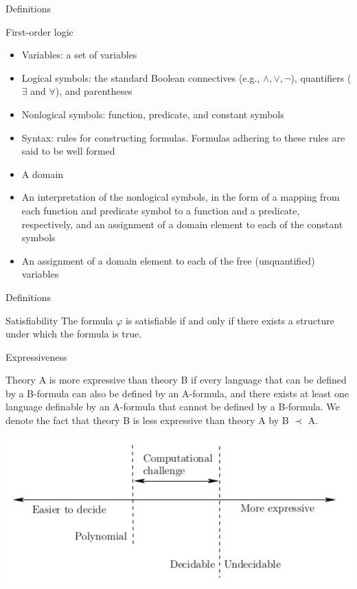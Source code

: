 \documentclass[mathserif]{beamer}
\begin{document}
\begin{frame}{Definitions}
\begin{block}{First-order logic}
\begin{itemize}
\item Variables: a set of variables
\item Logical symbols: the standard Boolean connectives (e.g., $\wedge, \vee, \lnot$), quantifiers ($\exists$ and $\forall$), and parentheses
\item Nonlogical symbols: function, predicate, and constant symbols
\item Syntax: rules for constructing formulas. Formulas adhering to these rules are said to be well formed
\end{itemize}
\end{block}
\begin{block}{}
\begin{itemize}
\item A domain
\item An interpretation of the nonlogical symbols, in the form of a mapping from each function and predicate symbol to a function and a predicate, respectively, and an assignment of a domain element to each of the constant symbols
\item An assignment of a domain element to each of the free (unquantified) variables
\end{itemize}
\end{block}
\end{frame}

\begin{frame}{Definitions}
\begin{block}{Satisfiability}
The formula $\varphi$ is satisfiable if and only if there exists a structure under which the formula is true.
\end{block}
\end{frame}

\begin{frame}{Expressiveness}
\begin{block}{}
Theory A is more expressive than theory B if every language that can be defined by a B-formula can also be defined by an A-formula, and there exists at least one language definable by an A-formula that cannot be defined by a B-formula. We denote the fact that theory B is less expressive than theory A by B $\prec$ A.
\end{block}
\includegraphics[scale=0.5]{expressiveness.png}
\end{frame}
\end{document}
